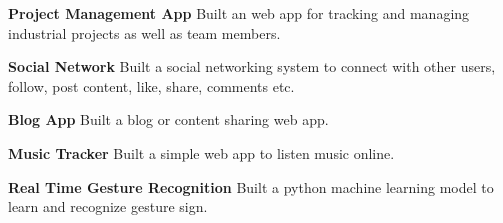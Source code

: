 

\begin{cventries}


  \cventry
     {} {} {} {} 
    {
      \begin{cvitems} %
        \item {\textbf{Project Management App} Built an web app for tracking and managing industrial projects as well as team members. }
        \item {\textbf{Social Network} Built a social networking system to connect with other users, follow, post content, like, share, comments etc.}
        \item {\textbf{Blog App} Built a blog or content sharing web app.}
        \item {\textbf{Music Tracker} Built a simple web app to listen music online.}
        \item {\textbf{Real Time Gesture Recognition } Built a python machine learning model to learn and recognize gesture sign. }
      \end{cvitems}
    }

\end{cventries}

